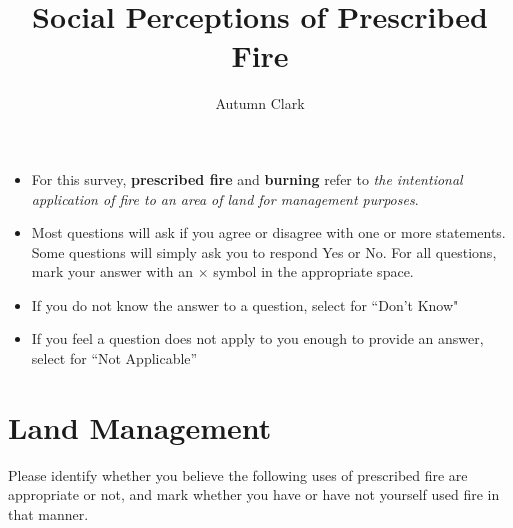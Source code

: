 \documentclass[
  english,
  ]{sdapsclassic}
\author{Autumn Clark}
\title{Social Perceptions of Prescribed Fire}
\begin{document}
 
  \begin{questionnaire}

    \begin{info}
\begin{itemize}
     \item For this survey, \textbf{prescribed fire} and \textbf{burning} refer to \emph{the intentional application of fire to an area of land for management purposes}.
      \item Most questions will ask if you agree or disagree with one or more statements. 
	     Some questions will simply ask you to respond Yes or No. 
	    For all questions, mark your answer with an $\times$ symbol in the appropriate space. 
      \item If you do not know the answer to a question, select {} for ``Don't Know"
      \item If you feel a question does not apply to you enough to provide an answer, select  for ``Not Applicable''
\end{itemize}
    \end{info}


    \section{Land Management}

    \begin{choicegroup}[rowsep=0.25em]{Please identify whether you believe the following uses of prescribed fire are appropriate or not, and mark whether you have or have not yourself used fire in that manner.}
      
      
    \end{choicegroup}



\end{questionnaire}
\end{document}
